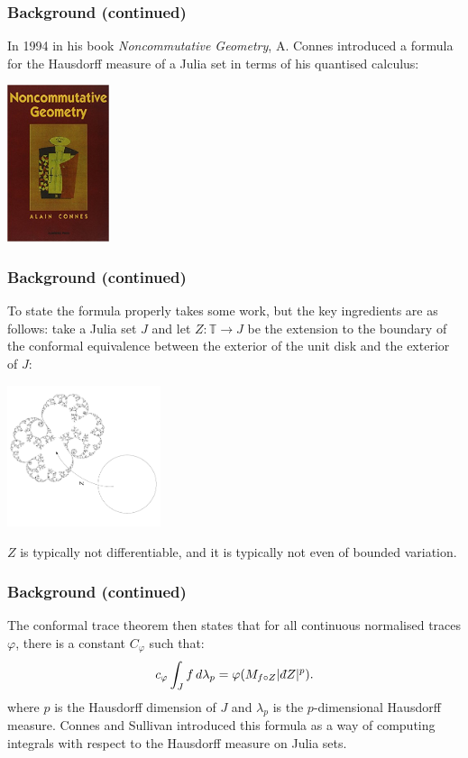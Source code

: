 \documentclass{beamer} %
\theoremstyle{definition} %
\newcommand{\Circ}{\mathbb{T}}
\def\qd{\,{\mathchar'26\mkern-12mu d}}
\begin{document}
\begin{frame}\frametitle{Background (continued)}
    In 1994 in his book {\it Noncommutative Geometry}, A. Connes introduced a formula for the Hausdorff measure of a Julia set in terms of his quantised calculus:
    \begin{center}
    \includegraphics[width=30mm]{img/ncg-book-cover.jpg}
    \end{center}
\end{frame}

\begin{frame}\frametitle{Background (continued)}
    To state the formula properly takes some work, but the key ingredients are as follows: take a Julia set $J$ and let $Z:\Circ\to J$ be the extension
    to the boundary of the conformal equivalence between the exterior of the unit disk and the exterior of $J$:
    \begin{center}
        \includegraphics[width=45mm]{img/riemann-mapping.png}
    \end{center}
    $Z$ is typically not differentiable, and it is typically not even of bounded variation.
\end{frame}

\begin{frame}\frametitle{Background (continued)}
    The conformal trace theorem then states that for all continuous normalised traces $\varphi$, there is a constant $C_{\varphi}$ such that:
    \begin{equation*}
        c_{\varphi}\int_J f\,d\lambda_p = \varphi(M_{f\circ Z}|\qd Z|^p).
    \end{equation*}
    where $p$ is the Hausdorff dimension of $J$ and $\lambda_p$ is the $p$-dimensional Hausdorff measure. Connes and Sullivan introduced this formula as a way of computing integrals with respect to the Hausdorff measure on Julia sets.
\end{frame}
\end{document}
